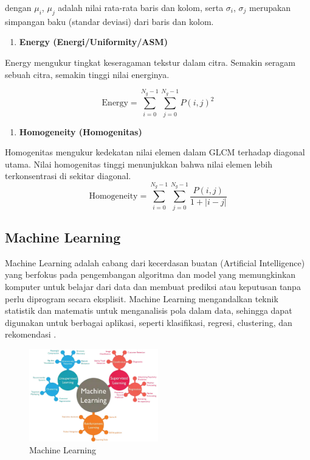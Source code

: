 dengan $\mu_i$, $\mu_j$ adalah nilai rata-rata baris dan kolom, serta $\sigma_i$, $\sigma_j$ merupakan simpangan baku (standar deviasi) dari baris dan kolom.
\begin{enumerate}[resume]
	\item \textbf{Energy (Energi/Uniformity/ASM)} \label{II.Ekstraksi Fitur Tekstur.Energi}
\end{enumerate}

Energy mengukur tingkat keseragaman tekstur dalam citra. Semakin seragam sebuah citra, semakin tinggi nilai energinya.

\begin{equation}
\text{Energy} = \sum_{i=0}^{N_g-1} \sum_{j=0}^{N_g-1} P(i,j)^2
\label{eq:glcm-energy}
\end{equation}

\begin{enumerate}[resume]
	\item \textbf{Homogeneity (Homogenitas)} \label{II.Ekstraksi Fitur Tekstur.Energi}
\end{enumerate}

Homogenitas mengukur kedekatan nilai elemen dalam GLCM terhadap diagonal utama. Nilai homogenitas tinggi menunjukkan bahwa nilai elemen lebih terkonsentrasi di sekitar diagonal.
\begin{equation}
\text{Homogeneity} = \sum_{i=0}^{N_g-1} \sum_{j=0}^{N_g-1} \frac{P(i,j)}{1 + |i-j|}
\label{eq:glcm-homogeneity}
\end{equation}


\subsection{Machine Learning} \label{II. Machine Learning}
Machine Learning adalah cabang dari kecerdasan buatan (Artificial Intelligence) yang berfokus pada pengembangan algoritma dan model yang memungkinkan komputer untuk belajar dari data dan membuat prediksi atau keputusan tanpa perlu diprogram secara eksplisit. Machine Learning mengandalkan teknik statistik dan matematis untuk menganalisis pola dalam data, sehingga dapat digunakan untuk berbagai aplikasi, seperti klasifikasi, regresi, clustering, dan rekomendasi \cite{diana2023penggunaan}.

\begin{figure}[H]
	\centering
	\includegraphics[width=0.5\textwidth]{figure/chapter-2-machine-learning.png}
	\caption{Machine Learning}
	\label{fig:2. Machine Learning}
\end{figure}

